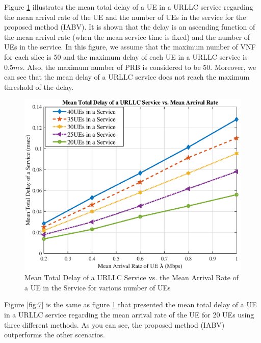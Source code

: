 \documentclass[conference]{IEEEtran}
\begin{document}
Figure \ref{fig:6} illustrates the mean total delay of a UE in a URLLC service regarding the mean arrival rate of the UE and the number of UEs in the service for the proposed method (IABV).
It is shown that the delay is an ascending function of the mean arrival rate (when the mean service time is fixed) and the number of UEs in the service. In this figure, we assume that the maximum number of VNF for each slice is 50 and the maximum delay of each UE in a URLLC service is $0.5ms$. Also, the maximum number of PRB is considered to be 50. 
 Moreover, we can see that the mean delay of a URLLC service 
does not reach the maximum threshold of the delay.
\begin{figure}
  \centering 
    \includegraphics[scale = 0.47]{delay_new.eps}
  \caption{Mean Total Delay of a URLLC Service vs. the Mean Arrival Rate of a UE in the Service for various number of UEs}
  \label{fig:6}
\end{figure}
Figure \ref{fig:7} is the same as figure \ref{fig:6} that presented the mean total delay of a UE in a URLLC service regarding the mean arrival rate of the UE for 20 UEs using three different methods. As you can see, the proposed method (IABV) outperforms the other scenarios.
\end{document}
